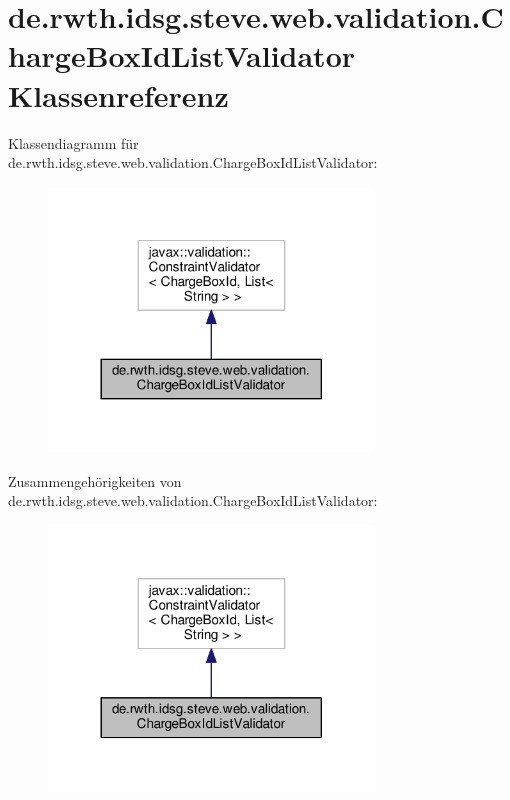 \hypertarget{classde_1_1rwth_1_1idsg_1_1steve_1_1web_1_1validation_1_1_charge_box_id_list_validator}{\section{de.\+rwth.\+idsg.\+steve.\+web.\+validation.\+Charge\+Box\+Id\+List\+Validator Klassenreferenz}
\label{classde_1_1rwth_1_1idsg_1_1steve_1_1web_1_1validation_1_1_charge_box_id_list_validator}
}


Klassendiagramm für de.\+rwth.\+idsg.\+steve.\+web.\+validation.\+Charge\+Box\+Id\+List\+Validator\+:\nopagebreak
\begin{figure}[H]
\begin{center}
\leavevmode
\includegraphics[width=245pt]{classde_1_1rwth_1_1idsg_1_1steve_1_1web_1_1validation_1_1_charge_box_id_list_validator__inherit__graph}
\end{center}
\end{figure}


Zusammengehörigkeiten von de.\+rwth.\+idsg.\+steve.\+web.\+validation.\+Charge\+Box\+Id\+List\+Validator\+:\nopagebreak
\begin{figure}[H]
\begin{center}
\leavevmode
\includegraphics[width=245pt]{classde_1_1rwth_1_1idsg_1_1steve_1_1web_1_1validation_1_1_charge_box_id_list_validator__coll__graph}
\end{center}
\end{figure}
